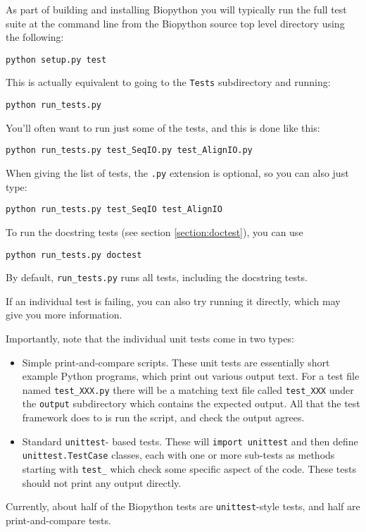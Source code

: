 \documentclass{report}
\begin{document}
As part of building and installing Biopython you will typically
run the full test suite at the command line from the Biopython
source top level directory using the following:
\begin{verbatim}
python setup.py test
\end{verbatim}
This is actually equivalent to going to the \verb|Tests|
subdirectory and running:
\begin{verbatim}
python run_tests.py
\end{verbatim}

You'll often want to run just some of the tests, and this is done
like this:
\begin{verbatim}
python run_tests.py test_SeqIO.py test_AlignIO.py
\end{verbatim}
When giving the list of tests, the \verb|.py| extension is optional,
so you can also just type:
\begin{verbatim}
python run_tests.py test_SeqIO test_AlignIO
\end{verbatim}
To run the docstring tests (see section \ref{section:doctest}), you can use
\begin{verbatim}
python run_tests.py doctest
\end{verbatim}
By default, \verb|run_tests.py| runs all tests, including the docstring tests.

If an individual test is failing, you can also try running it
directly, which may give you more information.

Importantly, note that the individual unit tests come in two types:
\begin{itemize}
\item Simple print-and-compare scripts.  These unit tests are
      essentially short example Python programs, which print out
      various output text.  For a test file named \verb|test_XXX.py|
      there will be a matching text file called \verb|test_XXX| under
      the \verb|output| subdirectory which contains the expected
      output.  All that the test framework does to is run the script,
      and check the output agrees.
\item Standard \verb|unittest|- based tests.  These will \verb|import unittest|
      and then define \verb|unittest.TestCase| classes, each with one
      or more sub-tests as methods starting with \verb|test_| which
      check some specific aspect of the code.
      These tests should not print any output directly.
\end{itemize}
Currently, about half of the Biopython tests are \verb|unittest|-style tests, and half are print-and-compare tests.
\end{document}
